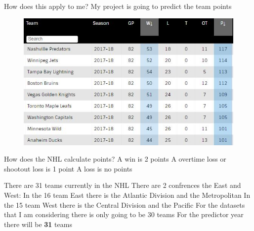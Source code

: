 \documentclass{beamer}
\begin{document}
	\begin{frame}
	How does this apply to me? \newline
	My project is going to predict the team points 
	\begin{figure}
		\includegraphics[width=0.7\linewidth]{Images/PicturePoints}
	\end{figure} 	
	\end{frame}

	\begin{frame}
	How does the NHL calculate points? \newline
	A win is 2 points \newline
	A overtime loss or shootout loss is 1 point  \newline
	A loss is no points
	\end{frame}

	\begin{frame}
	There are 31 teams currently in the NHL \newline
	There are 2 confrences the East and West: \newline
	In the 16 team East there is the Atlantic Division and the Metropolitan \newline
	In the 15 team West there is the Central Division and the Pacific \newline
	For the datasets that I am considering there is only going to be 30 teams \newline
	For the predictor year there will be \textbf{31} teams
	\end{frame}
\end{document}
